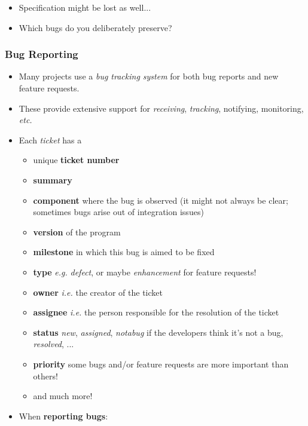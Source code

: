 \documentclass[a4paper]{article}
\providecommand{\tightlist}{%
  \setlength{\itemsep}{0pt}\setlength{\parskip}{0pt}}
\begin{document}
\begin{itemize}
\tightlist
\item
  Specification might be lost as well...
\item
  Which bugs do you deliberately preserve?
\end{itemize}

\hypertarget{bug-reporting}{%
\subsubsection{Bug Reporting}\label{bug-reporting}}

\begin{itemize}
\item
  Many projects use a \emph{bug tracking system} for both bug reports
  and new feature requests.
\item
  These provide extensive support for \emph{receiving}, \emph{tracking},
  notifying, monitoring, \emph{etc.}
\item
  Each \emph{ticket} has a

  \begin{itemize}
  \tightlist
  \item
    unique \textbf{ticket number}
  \item
    \textbf{summary}
  \item
    \textbf{component} where the bug is observed (it might not always be
    clear; sometimes bugs arise out of integration issues)
  \item
    \textbf{version} of the program
  \item
    \textbf{milestone} in which this bug is aimed to be fixed
  \item
    \textbf{type} \emph{e.g.} \emph{defect}, or maybe \emph{enhancement}
    for feature requests!
  \item
    \textbf{owner} \emph{i.e.} the creator of the ticket
  \item
    \textbf{assignee} \emph{i.e.} the person responsible for the
    resolution of the ticket
  \item
    \textbf{status} \emph{new}, \emph{assigned}, \emph{notabug} if the
    developers think it's not a bug, \emph{resolved}, ...
  \item
    \textbf{priority} some bugs and/or feature requests are more
    important than others!
  \item
    and much more!
  \end{itemize}
\item
  When \textbf{reporting bugs}:


\end{itemize}
\end{document}
